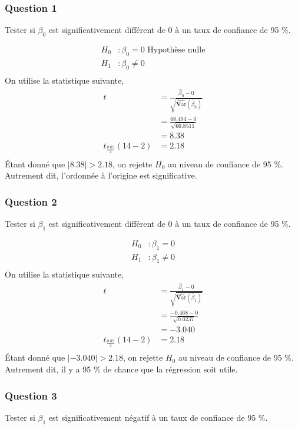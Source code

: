 \documentclass[11pt,french]{report}
\newcommand{\Var}{\mathrm{\textbf{V}ar}}
\begin{document}
\subsubsection*{Question 1}
Tester si $\beta_0$ est significativement différent de 0 à un taux de confiance de 95 \%.

\begin{align*}
H_0 &: \beta_0 = 0 \text{ Hypothèse nulle} \\
H_1 &: \beta_0 \neq 0 \\
\end{align*}
On utilise la statistique suivante,
\begin{align*}
t &= \frac{\hat{\beta}_0 - 0 }{\sqrt{\widehat{\Var}(\hat{\beta}_0)}} \\
&= \frac{68.494 - 0}{\sqrt{66.8511}}\\
&= 8.38\\
t_{\frac{0.05}{2}}(14-2) &= 2.18 \\
\end{align*}
Étant donné que $|8.38| > 2.18$, on rejette $H_0$ au niveau de confiance de 95 \%. Autrement dit, l'ordonnée à l'origine est significative.

\subsubsection*{Question 2}
Tester si $\beta_1$ est significativement différent de 0 à un taux de confiance de 95 \%.

\begin{align*}
H_0 &: \beta_1 = 0\\
H_1 &: \beta_1 \neq 0 \\
\end{align*}
On utilise la statistique suivante,
\begin{align*}
t &= \frac{\hat{\beta}_1 - 0 }{\sqrt{\widehat{\Var}(\hat{\beta}_1)}} \\
&= \frac{-0.468 - 0}{\sqrt{0.0237}}\\
&= -3.040\\
t_{\frac{0.05}{2}}(14-2) &= 2.18\\
\end{align*}
Étant donné que $|-3.040| > 2.18$, on rejette $H_0$ au niveau de confiance de 95 \%. Autrement dit, il y a 95 \% de chance que la régression soit utile.

\subsubsection*{Question 3}
Tester si $\beta_1$ est significativement négatif à un taux de confiance de 95 \%.
\end{document}
